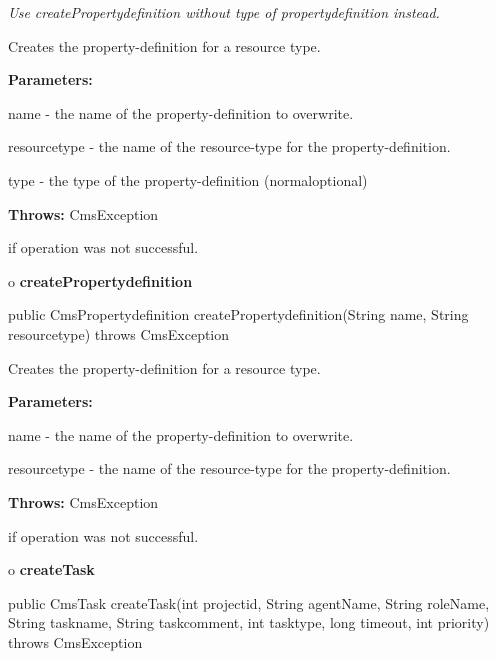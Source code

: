 \begin{description}
 {\it Use
createPropertydefinition without type of propertydefinition instead.} 

Creates the property-definition for a resource type. 

\begin{description}
\item {\bf Parameters:}  

name - the name of the property-definition to overwrite.  

resourcetype - the name of the resource-type for the property-definition.  

type - the type of the property-definition (normal{\htmlBar}optional)  
\item {\bf Throws:} CmsException  

if operation was not successful.  
\end{description}

\end{description}

o {\bf createPropertydefinition} 

\begin{PRE}
 public CmsPropertydefinition createPropertydefinition(String name,
                                                       String resourcetype) throws CmsException
\end{PRE}

\begin{description}
\htmlDD Creates the property-definition for a resource type. 

\begin{description}
\item {\bf Parameters:}  

name - the name of the property-definition to overwrite.  

resourcetype - the name of the resource-type for the property-definition.  
\item {\bf Throws:} CmsException  

if operation was not successful.  
\end{description}

\end{description}

o {\bf createTask} 

\begin{PRE}
 public CmsTask createTask(int projectid,
                           String agentName,
                           String roleName,
                           String taskname,
                           String taskcomment,
                           int tasktype,
                           long timeout,
                           int priority) throws CmsException
\end{PRE}

